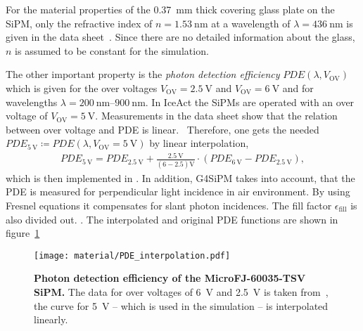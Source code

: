 For the material properties of the \SI{0.37}{\milli\meter} thick covering glass plate on the SiPM, only the refractive index of $n = \SI{1.53}{\nano\meter}$ at a wavelength of $\lambda = \SI{436}{\nano\meter}$ is given in the data sheet~\cite{sipm:datasheet}. Since there are no detailed information about the glass, $n$ is assumed to be constant for the simulation.

The other important property is the \textit{photon detection efficiency} $PDE(\lambda,V_\text{OV})$ which is given for the over voltages $V_\text{OV}=\SI{2.5}{\volt}$ and $V_\text{OV}=\SI{6}{\volt}$ and for wavelengths $\lambda = \SIrange{200}{900}{\nano\meter}$. In IceAct the SiPMs are operated with an over voltage of $V_\text{OV} = \SI{5}{\volt}$. Measurements in the data sheet show that the relation between over voltage and PDE is linear.~\cite{sipm:datasheet} Therefore, one gets the needed $PDE_{\SI{5}{\volt}}\coloneqq PDE(\lambda,V_\text{OV}=\SI{5}{\volt})$ by linear interpolation,
\begin{align}
	PDE_{\SI{5}{\volt}} = PDE_{\SI{2.5}{\volt}} + \frac{\SI{2.5}{\volt}}{(6-2.5)\si{\volt}} \cdot (PDE_{\SI{6}{\volt}}-PDE_{\SI{2.5}{\volt}}),
\end{align}
which is then implemented in \geant. In addition, G4SiPM takes into account, that the PDE is measured for perpendicular light incidence in air environment. By using Fresnel equations it compensates for slant photon incidences. The fill factor $\epsilon_\text{fill}$ is also divided out. \cite{sipm:g4sipm,famous:niggemann}. 
The interpolated and original PDE functions are shown in figure~\ref{sipm:pde}

\begin{figure}[H]
	\centering
	\texttt{[image: material/PDE\_interpolation.pdf]}
	\caption[Photon detection efficiency of the MicroFJ-60035-TSV SiPM]{\textbf{Photon detection efficiency of the MicroFJ-60035-TSV SiPM.} The data for over voltages of \SI{6}{\volt} and \SI{2.5}{\volt} is taken from~\cite{sipm:datasheet}, the curve for \SI{5}{\volt} -- which is used in the \geant simulation -- is interpolated linearly.}
	\label{sipm:pde}	
\end{figure}
